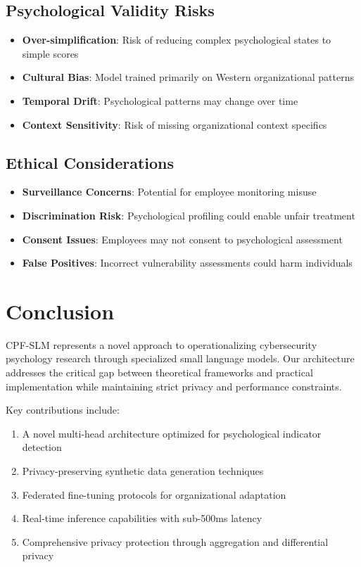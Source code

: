 \documentclass[11pt,a4paper]{article}
\begin{document}
\subsection{Psychological Validity Risks}

\begin{itemize}
\item \textbf{Over-simplification}: Risk of reducing complex psychological states to simple scores
\item \textbf{Cultural Bias}: Model trained primarily on Western organizational patterns
\item \textbf{Temporal Drift}: Psychological patterns may change over time
\item \textbf{Context Sensitivity}: Risk of missing organizational context specifics
\end{itemize}

\subsection{Ethical Considerations}

\begin{itemize}
\item \textbf{Surveillance Concerns}: Potential for employee monitoring misuse
\item \textbf{Discrimination Risk}: Psychological profiling could enable unfair treatment
\item \textbf{Consent Issues}: Employees may not consent to psychological assessment
\item \textbf{False Positives}: Incorrect vulnerability assessments could harm individuals
\end{itemize}

\section{Conclusion}

CPF-SLM represents a novel approach to operationalizing cybersecurity psychology research through specialized small language models. Our architecture addresses the critical gap between theoretical frameworks and practical implementation while maintaining strict privacy and performance constraints.

Key contributions include:

\begin{enumerate}
\item A novel multi-head architecture optimized for psychological indicator detection
\item Privacy-preserving synthetic data generation techniques
\item Federated fine-tuning protocols for organizational adaptation
\item Real-time inference capabilities with sub-500ms latency
\item Comprehensive privacy protection through aggregation and differential privacy
\end{enumerate}
\end{document}
